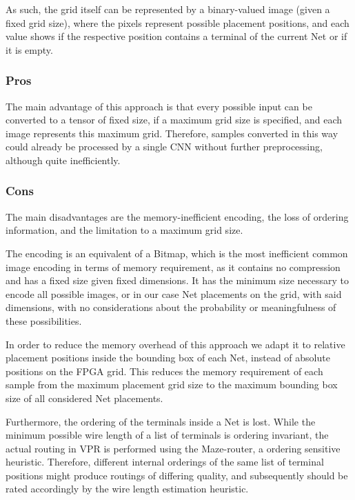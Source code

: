 As such, the grid itself can be represented by a binary-valued image (given a fixed grid size), where the pixels represent possible placement positions, and each value shows if the respective position contains a terminal of the current Net or if it is empty.

\subsubsection{Pros}

The main advantage of this approach is that every possible input can be converted to a tensor of fixed size, if a maximum grid size is specified, and each image represents this maximum grid. Therefore, samples converted in this way could already be processed by a single \gls{CNN} without further preprocessing, although quite inefficiently.

\subsubsection{Cons}

The main disadvantages are the memory-inefficient encoding, the loss of ordering information, and the limitation to a maximum grid size.

The encoding is an equivalent of a Bitmap, which is the most inefficient common image encoding in terms of memory requirement, as it contains no compression and has a fixed size given fixed dimensions. It has the minimum size necessary to encode all possible images, or in our case Net placements on the grid, with said dimensions, with no considerations about the probability or meaningfulness of these possibilities.

In order to reduce the memory overhead of this approach we adapt it to relative placement positions inside the bounding box of each Net, instead of absolute positions on the \gls{FPGA} grid. This reduces the memory requirement of each sample from the maximum placement grid size to the maximum bounding box size of all considered Net placements.

Furthermore, the ordering of the terminals inside a Net is lost. While the minimum possible wire length of a list of terminals is ordering invariant, the actual routing in \gls{VPR} is performed using the Maze-router, a ordering sensitive heuristic. Therefore, different internal orderings of the same list of terminal positions might produce routings of differing quality, and subsequently should be rated accordingly by the wire length estimation heuristic.

